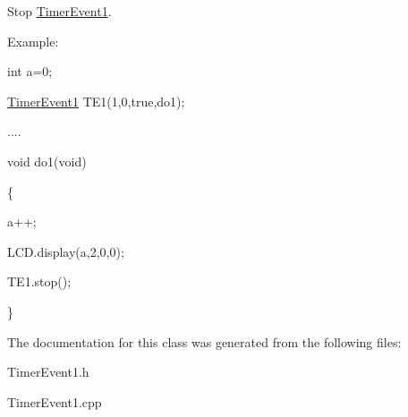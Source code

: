 \label{class_timer_event1_aed7772681d46c2cf3599d87ba4b3bac2}
\par
Stop \hyperlink{class_timer_event1}{TimerEvent1}.\par
 \par
Example:\par
\par
 int a=0; \par
 \hyperlink{class_timer_event1}{TimerEvent1} TE1(1,0,true,do1);\par
 .... \par
 void do1(void)\par
 \{ \par
 a++; \par
 LCD.display(a,2,0,0);\par
 TE1.stop(); \par
 \}\par
 

The documentation for this class was generated from the following files:\begin{DoxyCompactItemize}
\item 
TimerEvent1.h\item 
TimerEvent1.cpp\end{DoxyCompactItemize}

